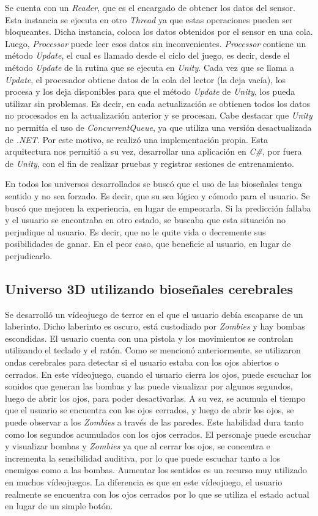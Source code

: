 Se cuenta con un \emph{Reader}, que es el encargado de obtener los datos del sensor. Esta instancia se ejecuta en otro \emph{Thread} ya que estas operaciones pueden ser bloqueantes. Dicha instancia, coloca los datos obtenidos por el sensor en una cola. Luego, \emph{Processor} puede leer esos datos sin inconvenientes. \emph{Processor} contiene un método \emph{Update}, el cual es llamado desde el ciclo del juego, es decir, desde el método \emph{Update} de la rutina que se ejecuta en \emph{Unity}. Cada vez que se llama a \emph{Update}, el procesador obtiene datos de la cola del lector (la deja vacía), los procesa y los deja disponibles para que el método \emph{Update} de \emph{Unity}, los pueda utilizar sin problemas. Es decir, en cada actualización se obtienen todos los datos no procesados en la actualización anterior y se procesan. Cabe destacar que \emph{Unity} no permitía el uso de \emph{ConcurrentQueue}, ya que utiliza una versión desactualizada de \emph{.NET}. Por este motivo, se realizó una implementación propia. Esta arquitectura nos permitió a su vez, desarrollar una aplicación en \emph{C\#}, por fuera de \emph{Unity}, con el fin de realizar pruebas y registrar sesiones de entrenamiento.

En todos los universos desarrollados se buscó que el uso de las bioseñales tenga sentido y no sea forzado. Es decir, que su sea lógico y cómodo para el usuario. Se buscó que mejoren la experiencia, en lugar de empeorarla. Si la predicción fallaba y el usuario se encontraba en otro estado, se buscaba que esta situación no perjudique al usuario. Es decir, que no le quite vida o decremente sus posibilidades de ganar. En el peor caso, que beneficie al usuario, en lugar de perjudicarlo.

\subsection{Universo 3D utilizando bioseñales cerebrales}

Se desarrolló un vídeojuego de terror en el que el usuario debía escaparse de un laberinto. Dicho laberinto es oscuro, está custodiado por \emph{Zombies} y hay bombas escondidas. El usuario cuenta con una pistola y los movimientos se controlan utilizando el teclado y el ratón. Como se mencionó anteriormente, se utilizaron ondas cerebrales para detectar si el usuario estaba con los ojos abiertos o cerrados. En este vídeojuego, cuando el usuario cierra los ojos, puede escuchar los sonidos que generan las bombas y las puede visualizar por algunos segundos, luego de abrir los ojos, para poder desactivarlas. A su vez, se acumula el tiempo que el usuario se encuentra con los ojos cerrados, y luego de abrir los ojos, se puede observar a los \emph{Zombies} a través de las paredes. Este habilidad dura tanto como los segundos acumulados con los ojos cerrados. El personaje puede escuchar y visualizar bombas y \emph{Zombies} ya que al cerrar los ojos, se concentra e incrementa la sensibilidad auditiva, por lo que puede escuchar tanto a los enemigos como a las bombas. Aumentar los sentidos es un recurso muy utilizado en muchos vídeojuegos. La diferencia es que en este vídeojuego, el usuario realmente se encuentra con los ojos cerrados por lo que se utiliza el estado actual en lugar de un simple botón.

